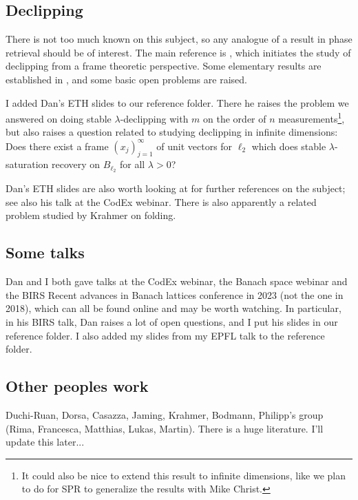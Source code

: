 \documentclass[12pt,leqno]{amsart}
\numberwithin{equation}{section}
\theoremstyle{plain}
\theoremstyle{definition}
\begin{document}
\subsection{Declipping} 
There is not too much known on this subject, so any analogue of a result in phase retrieval should be of interest. The main reference is \cite{alharbi2024declipping}, which initiates the study of declipping from a frame theoretic perspective. Some elementary results are established in \cite{alharbi2024declipping}, and some basic open problems are raised.
\medskip

I added Dan's ETH slides to our reference folder. There he raises the problem we answered on doing stable $\lambda$-declipping with $m$ on the order of $n$ measurements\footnote{It could also be nice to extend this result to infinite dimensions, like we plan to do for SPR to generalize the results with Mike Christ.}, but also raises a question related to studying declipping in infinite dimensions: Does there exist a frame $(x_j)_{j=1}^\infty$ of unit vectors for $\ell_2$ which does stable $\lambda$-saturation recovery on $B_{\ell_2}$ for all $\lambda >0$?
\medskip

Dan's ETH slides are also worth looking at for further references on the subject; see also his talk at the CodEx webinar. There is also apparently a related problem studied by Krahmer on folding.









\subsection{Some talks}
Dan and I both gave talks at the CodEx webinar, the Banach space webinar and the BIRS Recent advances in Banach lattices conference in 2023 (not the one in 2018), which can all be found online and may be worth watching. In particular, in his BIRS talk, Dan raises a lot of open questions, and I put his slides in our reference folder. I also added my slides from my EPFL talk to the reference folder.

\subsection{Other peoples work}
Duchi-Ruan, Dorsa, Casazza, Jaming, Krahmer, Bodmann, Philipp's group (Rima, Francesca, Matthias, Lukas, Martin). There is a huge literature. I'll update this later...
\medskip
\end{document}
